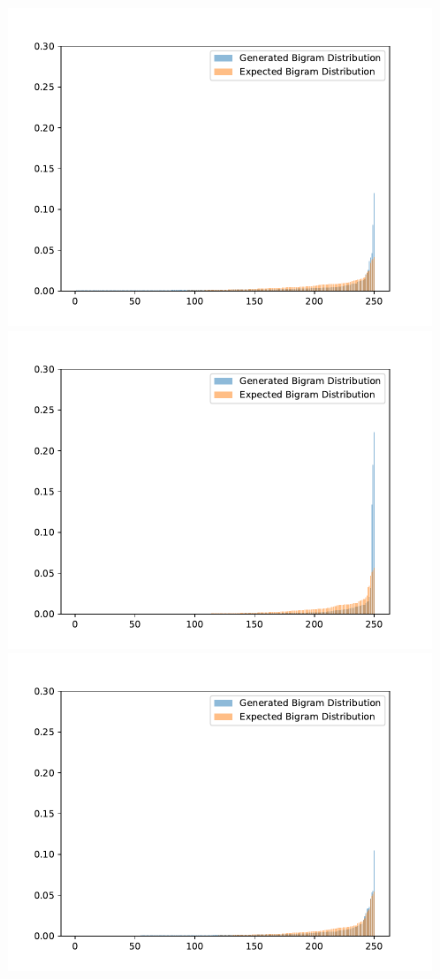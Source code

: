 \begin{figure}[H]
	\includegraphics[width=\linewidth]{img/plots/opensubtitles_not_reversed/bigram_distribution_comparison_step_1500000.pdf}
	\centering
	\small
	\endminipage\hfill
	\includegraphics[width=\linewidth]{img/plots/opensubtitles_not_reversed/bigram_distribution_comparison_step_2000000.pdf}
	\centering
	\small
	\endminipage\hfill
	\includegraphics[width=\linewidth]{img/plots/opensubtitles_not_reversed/bigram_distribution_comparison_step_2500000.pdf}

\end{figure}
